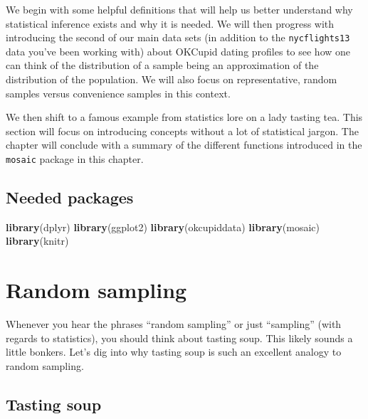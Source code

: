 \documentclass[]{tufte-book}
\newenvironment{Shaded}{\begin{snugshade}}{\end{snugshade}}
\newcommand{\KeywordTok}[1]{\textcolor[rgb]{0.13,0.29,0.53}{\textbf{{#1}}}}
\newcommand{\NormalTok}[1]{{#1}}
\begin{document}
We begin with some helpful definitions that will help us better
understand why statistical inference exists and why it is needed. We
will then progress with introducing the second of our main data sets (in
addition to the \texttt{nycflights13} data you've been working with)
about OKCupid dating profiles to see how one can think of the
distribution of a sample being an approximation of the distribution of
the population. We will also focus on representative, random samples
versus convenience samples in this context.

We then shift to a famous example from statistics lore on a lady tasting
tea. This section will focus on introducing concepts without a lot of
statistical jargon. The chapter will conclude with a summary of the
different functions introduced in the \texttt{mosaic} package in this
chapter.

\subsection*{Needed packages}\label{needed-packages-3}

\begin{Shaded}
\begin{Highlighting}[]
\KeywordTok{library}\NormalTok{(dplyr)}
\KeywordTok{library}\NormalTok{(ggplot2)}
\KeywordTok{library}\NormalTok{(okcupiddata)}
\KeywordTok{library}\NormalTok{(mosaic)}
\KeywordTok{library}\NormalTok{(knitr)}
\end{Highlighting}
\end{Shaded}

\section{Random sampling}\label{random-sampling}

Whenever you hear the phrases ``random sampling'' or just ``sampling''
(with regards to statistics), you should think about tasting soup. This
likely sounds a little bonkers. Let's dig into why tasting soup is such
an excellent analogy to random sampling.

\subsection{Tasting soup}\label{tasting-soup}
\end{document}
